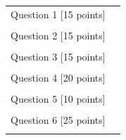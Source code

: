 \documentclass[a4paper,12pt,fleqn]{article}
\begin{document}
\begin{table}[h]
\centering
\begin{tabular}{| m{6cm} | m{6cm} |}
\hline
\vspace{0.5cm}
Question 1 [15 points] & \\
\vspace{0.5cm} &\vspace{0.5cm}\\
\hline
\vspace{0.5cm}
Question 2 [15 points] & \\
\vspace{0.5cm} &\vspace{0.5cm}\\
\hline
\vspace{0.5cm}
Question 3 [15 points] & \\
\vspace{0.5cm} &\vspace{0.5cm}\\
\hline
\vspace{0.5cm}
Question 4 [20 points] &  \\
\vspace{0.5cm} &\vspace{0.5cm}\\
\hline
\vspace{0.5cm}
Question 5 [10 points] & \\
\vspace{0.5cm} &\vspace{0.5cm}\\\hline
\vspace{0.5cm}
Question 6 [25 points] & \\
\vspace{0.5cm} &\vspace{0.5cm}\\\hline

\hline
\end{tabular}
\end{table}


\end{document}
